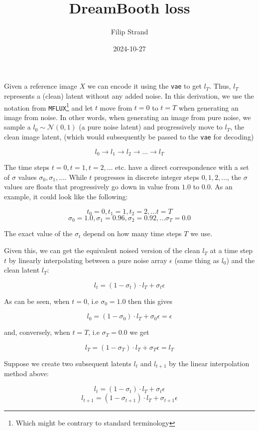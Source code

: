 \documentclass{article}
\begin{document}
\title{DreamBooth loss}
\author{Filip Strand}
\date{2024-10-27}
\maketitle

Given a reference image $X$ we can encode it using the \texttt{vae} to get $l_T$. Thus, $l_T$ represents a (clean) latent without any added noise. In this derivation, we use the notation from \texttt{MFLUX}\footnote{Which might be contrary to standard terminology} and let $t$ move from $t=0$ to $t=T$ when generating an image from noise. In other words, when generating an image from pure noise, we sample a $l_0 \sim \mathcal{N}(0,1)$ (a pure noise latent) and progressively move to $l_T$, the clean image latent, (which would subsequently be passed to the \texttt{vae} for decoding)
 
\[
    l_0 \rightarrow l_1 \rightarrow l_2 \rightarrow ... \rightarrow l_T
\]

The time steps $t=0, t=1, t=2, \dots$ etc. have a direct correspondence with a set of $\sigma$ values  $\sigma_0, \sigma_1, \dots$. While $t$ progresses in discrete integer steps $0, 1, 2, \dots$, the $\sigma$ values are floats that progressively go down in value from $1.0$ to $0.0$. As an example, it could look like the following:

\[
    t_0=0, t_1=1, t_2=2, \dots t=T
\]
\[
    \sigma_0=1.0, \sigma_1=0.96, \sigma_2=0.92, \dots \sigma_T = 0.0
\]

The exact value of the $\sigma_t$ depend on how many time steps $T$ we use. 

Given this, we can get the equivalent noised version of the clean $l_T$ at a time step $t$ by linearly interpolating between a pure noise array $\epsilon$ (same thing as $l_0$) and the clean latent $l_T$:


\[
    l_t = (1-\sigma_t) \cdot l_T + \sigma_t \epsilon
\]

As can be seen, when $t=0$, i.e $\sigma_0 = 1.0$ then this gives 

\[
    l_0 = (1-\sigma_0) \cdot l_T + \sigma_0 \epsilon = \epsilon
\]

and, conversely, when $t=T$, i.e $\sigma_T = 0.0$ we get

\[
    l_T = (1-\sigma_T) \cdot l_T + \sigma_T \epsilon = l_T
\]

Suppose we create two subsequent latents $l_t$ and $l_{t+1}$ by the linear interpolation method above: 

\[
    l_t = (1-\sigma_t) \cdot l_T + \sigma_t \epsilon
\]
\[
    l_{t+1} = (1-\sigma_{t+1}) \cdot l_T + \sigma_{t+1} \epsilon
\]
\end{document}
